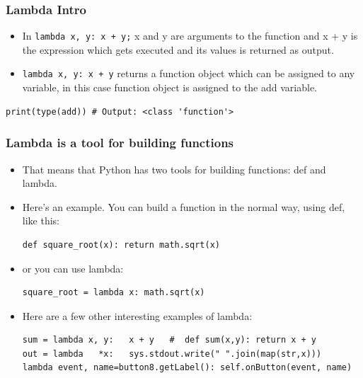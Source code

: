 \begin{frame}[fragile]\frametitle{Lambda Intro}

    \begin{itemize}
    \item  In \lstinline|lambda x, y: x + y;| x and y are arguments to the function and x + y is the expression which gets executed and its values is returned as output.
\item \lstinline|lambda x, y: x + y| returns a function object which can be assigned to any variable, in this case function object is assigned to the add variable.

    \end{itemize}
    \begin{lstlisting}
print(type(add)) # Output: <class 'function'>
\end{lstlisting}
\end{frame}


\begin{frame}[fragile]\frametitle{Lambda is a tool for building functions}

    \begin{itemize}
    \item That means that Python has two tools for building functions: def and lambda.
    \item Here's an example. You can build a function in the normal way, using def, like this:
        \begin{lstlisting}
def square_root(x): return math.sqrt(x)
\end{lstlisting}
\item or you can use lambda:
        \begin{lstlisting}
square_root = lambda x: math.sqrt(x)
\end{lstlisting}
\item Here are a few other interesting examples of lambda:
        \begin{lstlisting}
sum = lambda x, y:   x + y   #  def sum(x,y): return x + y
out = lambda   *x:   sys.stdout.write(" ".join(map(str,x)))
lambda event, name=button8.getLabel(): self.onButton(event, name)
\end{lstlisting}
    \end{itemize}

\end{frame}


